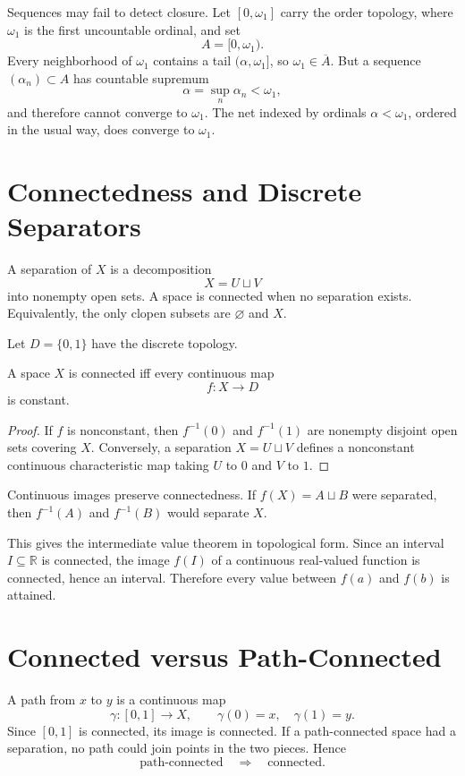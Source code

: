 Sequences may fail to detect closure.  Let \([0,\omega_1]\) carry the order topology, where \(\omega_1\) is the first uncountable ordinal, and set
\[
  A=[0,\omega_1).
\]
Every neighborhood of \(\omega_1\) contains a tail \((\alpha,\omega_1]\), so \(\omega_1\in\overline A\).  But a sequence \((\alpha_n)\subset A\) has countable supremum
\[
  \alpha=\sup_n\alpha_n<\omega_1,
\]
and therefore cannot converge to \(\omega_1\).  The net indexed by ordinals \(\alpha<\omega_1\), ordered in the usual way, does converge to \(\omega_1\).

\section{Connectedness and Discrete Separators}

A separation of \(X\) is a decomposition
\[
  X=U\sqcup V
\]
into nonempty open sets.  A space is connected when no separation exists.  Equivalently, the only clopen subsets are \(\varnothing\) and \(X\).

Let \(D=\{0,1\}\) have the discrete topology.

\begin{proposition}
A space \(X\) is connected iff every continuous map
\[
  f:X\to D
\]
is constant.
\end{proposition}

\begin{proof}
If \(f\) is nonconstant, then \(f^{-1}(0)\) and \(f^{-1}(1)\) are nonempty disjoint open sets covering \(X\).  Conversely, a separation \(X=U\sqcup V\) defines a nonconstant continuous characteristic map taking \(U\) to \(0\) and \(V\) to \(1\).
\end{proof}

Continuous images preserve connectedness.  If \(f(X)=A\sqcup B\) were separated, then \(f^{-1}(A)\) and \(f^{-1}(B)\) would separate \(X\).

This gives the intermediate value theorem in topological form.  Since an interval \(I\subseteq\mathbb R\) is connected, the image \(f(I)\) of a continuous real-valued function is connected, hence an interval.  Therefore every value between \(f(a)\) and \(f(b)\) is attained.

\section{Connected versus Path-Connected}

A path from \(x\) to \(y\) is a continuous map
\[
  \gamma:[0,1]\to X,
  \qquad
  \gamma(0)=x,
  \quad
  \gamma(1)=y.
\]
Since \([0,1]\) is connected, its image is connected.  If a path-connected space had a separation, no path could join points in the two pieces.  Hence
\[
  \text{path-connected}\quad\Longrightarrow\quad\text{connected}.
\]


